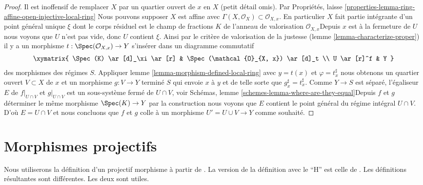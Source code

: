 \begin{proof}

Il est inoffensif de remplacer $X$ par un quartier ouvert de $x$ en $X$
(petit détail omis). Par Propriétés, laisse
\ref{properties-lemma-ring-affine-open-injective-local-ring}
Nous pouvons supposer $X$ est affine avec
$\Gamma(X, \mathcal{O}_X) \subset \mathcal{O}_{X, x}$. En particulier $X$ fait partie intégrante d'un point général unique $\xi$
dont le corps résiduel est le champ de fractions $K$ de l'anneau de valorisation $\mathcal{O}_{X, x}$Depuis $x$ est à la fermeture de $U$ nous voyons que $U$ n'est pas vide, donc $U$ contient $\xi$. Ainsi par le critère de valorisation de la justesse (lemme \ref{lemma-characterize-proper}) il y a un morphisme $t : \Spec(\mathcal{O}_{X, x}) \to Y$
s'insérer dans un diagramme commutatif
$$
\xymatrix{
\Spec(K) \ar[d]_\xi \ar[r] & \Spec(\mathcal{O}_{X, x}) \ar[d]_t \\
U \ar[r]^f & Y
}
$$
des morphismes des régimes $S$. Appliquer lemme \ref{lemma-morphism-defined-local-ring}
avec $y = t(x)$ et $\varphi = t^\sharp_x$ nous obtenons un quartier ouvert $V \subset X$ de $x$ et un morphisme $g : V \to Y$
terminé $S$ qui envoie $x$ à $y$ et de telle sorte que $g^\sharp_x = t^\sharp_x$. Comme $Y \to S$ est séparé, l'égaliseur $E$ de $f|_{U \cap V}$
et $g|_{U \cap V}$ est un sous-système fermé de $U \cap V$, voir Schémas, lemme \ref{schemes-lemma-where-are-they-equal}Depuis $f$ et $g$ déterminer le même morphisme $\Spec(K) \to Y$
par la construction nous voyons que $E$ contient le point général du régime intégral $U \cap V$. D'où $E = U \cap V$ et nous concluons que $f$ et $g$ colle à un morphisme $U' = U \cup V \to Y$
comme souhaité.

\end{proof}





\section{Morphismes projectifs}
\label{section-projective}

\noindent
Nous utiliserons la définition d'un projectif morphisme à partir de \cite{EGA}. La version de la définition avec le ``H'' est celle de \cite{H}. Les définitions résultantes sont différentes. Les deux sont utiles.

